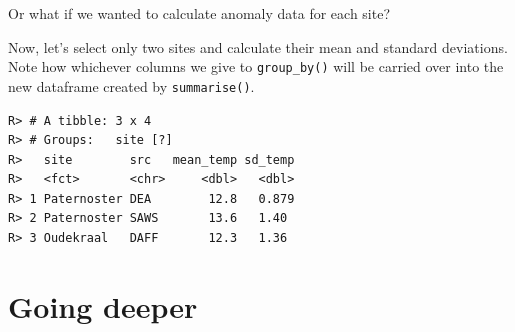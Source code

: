 \documentclass[]{book}
\newenvironment{Shaded}{\begin{snugshade}}{\end{snugshade}}
\newcommand{\KeywordTok}[1]{\textcolor[rgb]{0.13,0.29,0.53}{\textbf{#1}}}
\newcommand{\DataTypeTok}[1]{\textcolor[rgb]{0.13,0.29,0.53}{#1}}
\newcommand{\StringTok}[1]{\textcolor[rgb]{0.31,0.60,0.02}{#1}}
\newcommand{\OtherTok}[1]{\textcolor[rgb]{0.56,0.35,0.01}{#1}}
\newcommand{\OperatorTok}[1]{\textcolor[rgb]{0.81,0.36,0.00}{\textbf{#1}}}
\newcommand{\NormalTok}[1]{#1}
\theoremstyle{definition}
\theoremstyle{definition}
\theoremstyle{definition}
\theoremstyle{remark}
\begin{document}
Or what if we wanted to calculate anomaly data for each site?

\begin{Shaded}
\end{Shaded}

Now, let's select only two sites and calculate their mean and standard
deviations. Note how whichever columns we give to \texttt{group\_by()}
will be carried over into the new dataframe created by
\texttt{summarise()}.

\begin{Shaded}
\end{Shaded}

\begin{verbatim}
R> # A tibble: 3 x 4
R> # Groups:   site [?]
R>   site        src   mean_temp sd_temp
R>   <fct>       <chr>     <dbl>   <dbl>
R> 1 Paternoster DEA        12.8   0.879
R> 2 Paternoster SAWS       13.6   1.40 
R> 3 Oudekraal   DAFF       12.3   1.36
\end{verbatim}

\section{Going deeper}\label{going-deeper}
\end{document}
